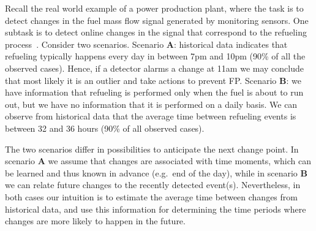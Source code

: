 Recall the real world example of a power production plant, where the task is to detect changes in the fuel mass flow signal generated by monitoring sensors.
One subtask is to detect online changes in the signal that correspond to the refueling process~\cite{PechenizkiySIGKDDExpl09}.
Consider two scenarios.
Scenario \textbf{A}: historical data indicates that refueling typically happens every day in between 7pm and 10pm (90\% of all the observed cases).
Hence, if a detector alarms a change at 11am we may conclude that most likely it is an outlier and take actions to prevent FP.
Scenario \textbf{B}: we have information that refueling is performed only when the fuel is about to run out, but we have no information that %
it is performed on a daily basis.
We can observe from historical data that the average time between refueling  events is between 32 and 36 hours (90\% of all observed cases).

The two scenarios differ in possibilities to anticipate the next change point.
In scenario \textbf{A} we assume that changes are associated with time moments, which can be learned and thus known in advance (e.g.\ end of the day), while in scenario \textbf{B} we can relate future changes to the recently detected event(s).
Nevertheless, in both cases our intuition is to estimate the average time between changes from historical data, and use this information for determining the time periods where changes are more likely to happen in the future.

